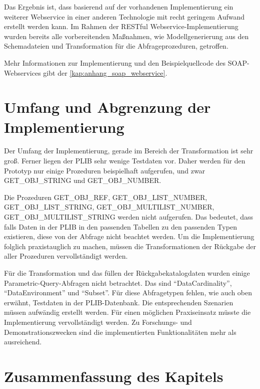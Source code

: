 Das Ergebnis ist, dass basierend auf der vorhandenen Implementierung ein weiterer Webservice in einer anderen Technologie mit recht geringem Aufwand erstellt werden kann. Im Rahmen der \gls{REST}ful \gls{Webservice}-Implementierung wurden bereits alle vorbereitenden Maßnahmen, wie Modellgenerierung aus den Schemadateien und Transformation für die Abfrageprozeduren, getroffen. 
 
Mehr Informationen zur Implementierung und den Beispielquellcode des \gls{SOAP}-\glspl{Webservice} gibt der \autoref{kap:anhang_soap_webservice}. 

\section{Umfang und Abgrenzung der Implementierung}

Der Umfang der Implementierung, gerade im Bereich der Transformation ist sehr groß. Ferner liegen der \gls{PLIB} sehr wenige Testdaten vor. Daher werden für den Prototyp nur einige Prozeduren beispielhaft aufgerufen, und zwar GET\_OBJ\_STRING und GET\_OBJ\_NUMBER. 

Die Prozeduren GET\_OBJ\_REF, GET\_OBJ\_LIST\_NUMBER, GET\_OBJ\_LIST\_STRING, GET\_OBJ\_MULTILIST\_NUMBER, GET\_OBJ\_MULTILIST\_STRING werden nicht aufgerufen. Das bedeutet, dass falls Daten in der \gls{PLIB} in den passenden Tabellen zu den passenden Typen existieren, diese von der Abfrage nicht beachtet werden. Um die Implementierung folglich praxistauglich zu machen, müssen die Transformationen der Rückgabe der aller Prozeduren vervollständigt werden. 

Für die Transformation und das füllen der Rückgabekatalogdaten wurden einige Parametric-Query-Abfragen nicht betrachtet. Das sind \enquote{DataCardinality}, \enquote{DataEnvironment} und \enquote{Subset}. Für diese Abfragetypen fehlen, wie auch oben erwähnt, Testdaten in der \gls{PLIB}-Datenbank. Die entsprechenden Szenarien müssen aufwändig erstellt werden. Für einen möglichen Praxiseinsatz müsste die Implementierung vervollständigt werden. Zu Forschungs- und Demonstrationszwecken sind die implementierten Funktionalitäten mehr als ausreichend. 
 
\section{Zusammenfassung des Kapitels}

